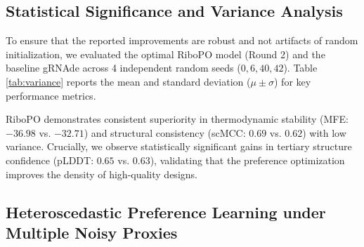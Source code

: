 {{\subsection{{Statistical Significance and Variance Analysis}}
\label{subsec:variance}

{
To ensure that the reported improvements are robust and not artifacts of random initialization, we evaluated the optimal RiboPO model (Round 2) and the baseline gRNAde across 4 independent random seeds ($0, 6, 40, 42$). Table \ref{tab:variance} reports the mean and standard deviation ($\mu \pm \sigma$) for key performance metrics.

RiboPO demonstrates consistent superiority in thermodynamic stability (MFE: $-36.98$ vs. $-32.71$) and structural consistency (scMCC: $0.69$ vs. $0.62$) with low variance. Crucially, we observe statistically significant gains in tertiary structure confidence (pLDDT: $0.65$ vs. $0.63$), validating that the preference optimization improves the density of high-quality designs.

\begin{table}[htbp]
\centering
\caption{Variance Analysis across 4 random seeds ($N=4$). Values represent Mean $\pm$ Standard Deviation. RiboPO achieves statistically significant improvements across both structural and thermodynamic axes.}
\label{tab:variance}
\end{table}
}


\subsection{Heteroscedastic Preference Learning under Multiple Noisy Proxies}
\label{app:hetero_derivation}

}}
